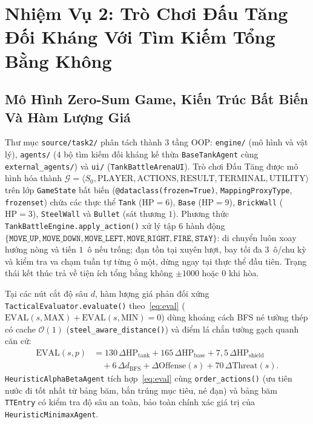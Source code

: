 \documentclass[conference]{IEEEtran}
\begin{document}
\section{Nhiệm Vụ 2: Trò Chơi Đấu Tăng Đối Kháng Với Tìm Kiếm Tổng Bằng Không}

\subsection{Mô Hình Zero-Sum Game, Kiến Trúc Bất Biến Và Hàm Lượng Giá}
Thư mục \texttt{source/task2/} phân tách thành $3$ tầng OOP: \texttt{engine/} (mô hình và vật lý), \texttt{agents/} ($4$ bộ tìm kiếm đối kháng kế thừa \texttt{BaseTankAgent} cùng \texttt{external\_agents/}) và \texttt{ui/} (\texttt{TankBattleArenaUI}). Trò chơi Đấu Tăng được mô hình hóa thành $\mathcal{G} = \langle S_0, \text{PLAYER}, \text{ACTIONS}, \text{RESULT}, \text{TERMINAL}, \text{UTILITY} \rangle$ \cite{russell2020aima,knuth1975alphabeta} trên lớp \texttt{GameState} bất biến (\texttt{@dataclass(frozen=True)}, \texttt{MappingProxyType}, \texttt{frozenset}) chứa các thực thể \texttt{Tank} ($\text{HP}=6$), \texttt{Base} ($\text{HP}=9$), \texttt{BrickWall} ($\text{HP}=3$), \texttt{SteelWall} và \texttt{Bullet} (sát thương $1$). Phương thức \texttt{TankBattleEngine.apply\_action()} xử lý tập $6$ hành động $\{\texttt{MOVE\_UP}, \texttt{MOVE\_DOWN}, \texttt{MOVE\_LEFT}, \texttt{MOVE\_RIGHT}, \texttt{FIRE}, \texttt{STAY}\}$: di chuyển luôn xoay hướng nòng và tiến $1$~ô nếu trống; đạn tồn tại xuyên lượt, bay tối đa $3$~ô/chu kỳ và kiểm tra va chạm tuần tự từng ô một, dừng ngay tại thực thể đầu tiên. Trạng thái kết thúc trả về tiện ích tổng bằng không $\pm 1000$ hoặc $0$ khi hòa.

Tại các nút cắt độ sâu $d$, hàm lượng giá phản đối xứng \texttt{TacticalEvaluator.evaluate()} theo~\eqref{eq:eval} ($\text{EVAL}(s, \text{MAX}) + \text{EVAL}(s, \text{MIN}) = 0$) dùng khoảng cách BFS né tường thép có cache $\mathcal{O}(1)$ (\texttt{steel\_aware\_distance()}) và điểm lá chắn tường gạch quanh căn cứ:
\begin{align}
\text{EVAL}(s, p) &= 130\,\Delta\text{HP}_{\text{tank}} + 165\,\Delta\text{HP}_{\text{base}} + 7,5\,\Delta\text{HP}_{\text{shield}} \nonumber\\
&\quad + 6\,\Delta d_{\text{BFS}} + \Delta\text{Offense}(s) + 70\,\Delta\text{Threat}(s).
\label{eq:eval}
\end{align}
\texttt{HeuristicAlphaBetaAgent} tích hợp~\eqref{eq:eval} cùng \texttt{order\_actions()} (ưu tiên nước đi tốt nhất từ bảng băm, bắn trúng mục tiêu, né đạn) và bảng băm \texttt{TTEntry} có kiểm tra độ sâu an toàn, bảo toàn chính xác giá trị của \texttt{HeuristicMinimaxAgent}.
\end{document}
